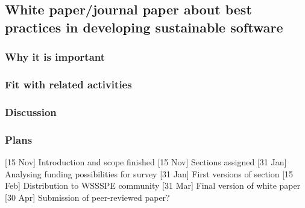 \subsection{White paper/journal paper about best practices in developing sustainable software}
\label{sec:best-practices}

\subsubsection{Why it is important}


\subsubsection{Fit with related activities}

\subsubsection{Discussion}

\subsubsection{Plans}

[15 Nov] Introduction and scope finished
[15 Nov] Sections assigned
[31 Jan] Analysing funding possibilities for survey
[31 Jan] First versions of section
[15 Feb] Distribution to WSSSPE community
[31 Mar] Final version of white paper
[30 Apr] Submission of peer-reviewed paper?



